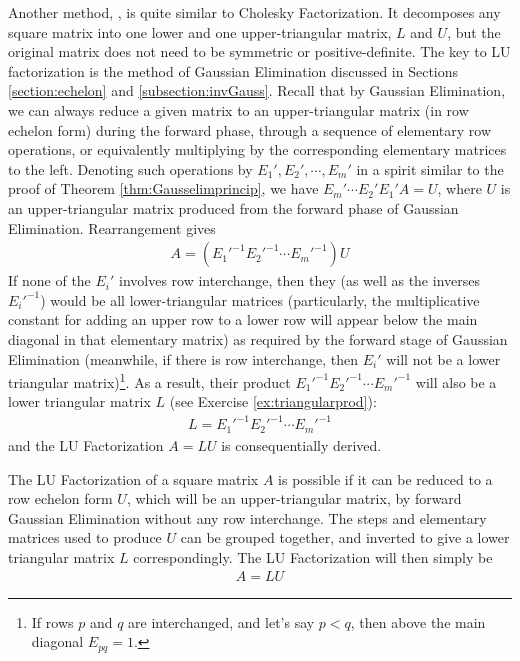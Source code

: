 Another method, , is quite similar to Cholesky Factorization. It decomposes any square matrix into one lower and one upper-triangular matrix, $L$ and $U$, but the original matrix does not need to be symmetric or positive-definite. The key to LU factorization is the method of Gaussian Elimination discussed in Sections \ref{section:echelon} and \ref{subsection:invGauss}. Recall that by Gaussian Elimination, we can always reduce a given matrix to an upper-triangular matrix (in row echelon form) during the forward phase, through a sequence of elementary row operations, or equivalently multiplying by the corresponding elementary matrices to the left. Denoting such operations by $E_1', E_2', \cdots, E_m'$ in a spirit similar to the proof of Theorem \ref{thm:Gausselimprincip}, we have $E_m'\cdots E_2'E_1'A = U$, where $U$ is an upper-triangular matrix produced from the forward phase of Gaussian Elimination. Rearrangement gives
\begin{align}
A = (E_1'^{-1}E_2'^{-1}\cdots E_m'^{-1})U    
\end{align}
If none of the $E_i'$ involves row interchange, then they (as well as the inverses $E_i'^{-1}$) would be all lower-triangular matrices (particularly, the multiplicative constant for adding an upper row to a lower row will appear below the main diagonal in that elementary matrix) as required by the forward stage of Gaussian Elimination (meanwhile, if there is row interchange, then $E_i'$ will not be a lower triangular matrix)\footnote{If rows $p$ and $q$ are interchanged, and let's say $p < q$, then above the main diagonal $E_{pq} = 1$.}. As a result, their product $E_1'^{-1}E_2'^{-1}\cdots E_m'^{-1}$ will also be a lower triangular matrix $L$ (see Exercise \ref{ex:triangularprod}):
\begin{align}
L = E_1'^{-1}E_2'^{-1}\cdots E_m'^{-1}    
\end{align}
and the LU Factorization $A = LU$ is consequentially derived.
\begin{thm}[LU Factorization]
The LU Factorization of a square matrix $A$ is possible if it can be reduced to a row echelon form $U$, which will be an upper-triangular matrix, by forward Gaussian Elimination without any row interchange. The steps and elementary matrices used to produce $U$ can be grouped together, and inverted to give a lower triangular matrix $L$ correspondingly. The LU Factorization will then simply be
\begin{align}
A = LU   
\end{align}
\end{thm}

